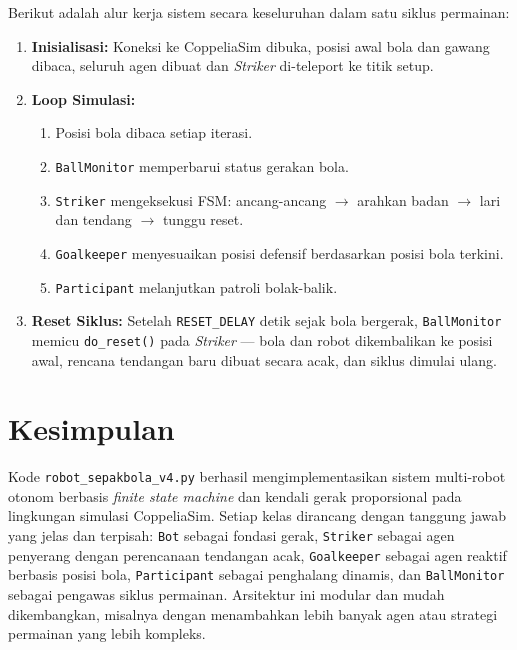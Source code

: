 \documentclass{article}
\begin{document}
Berikut adalah alur kerja sistem secara keseluruhan dalam satu siklus permainan:

\begin{enumerate}
    \item \textbf{Inisialisasi:} Koneksi ke CoppeliaSim dibuka, posisi awal
          bola dan gawang dibaca, seluruh agen dibuat dan \textit{Striker}
          di-teleport ke titik setup.
    \item \textbf{Loop Simulasi:}
    \begin{enumerate}
        \item Posisi bola dibaca setiap iterasi.
        \item \texttt{BallMonitor} memperbarui status gerakan bola.
        \item \texttt{Striker} mengeksekusi FSM: ancang-ancang $\to$ arahkan
              badan $\to$ lari dan tendang $\to$ tunggu reset.
        \item \texttt{Goalkeeper} menyesuaikan posisi defensif berdasarkan
              posisi bola terkini.
        \item \texttt{Participant} melanjutkan patroli bolak-balik.
    \end{enumerate}
    \item \textbf{Reset Siklus:} Setelah \texttt{RESET\_DELAY} detik sejak
          bola bergerak, \texttt{BallMonitor} memicu \texttt{do\_reset()} pada
          \textit{Striker} — bola dan robot dikembalikan ke posisi awal, rencana
          tendangan baru dibuat secara acak, dan siklus dimulai ulang.
\end{enumerate}

\section{Kesimpulan}

Kode \texttt{robot\_sepakbola\_v4.py} berhasil mengimplementasikan sistem
multi-robot otonom berbasis \textit{finite state machine} dan kendali gerak
proporsional pada lingkungan simulasi CoppeliaSim. Setiap kelas dirancang
dengan tanggung jawab yang jelas dan terpisah: \texttt{Bot} sebagai fondasi
gerak, \texttt{Striker} sebagai agen penyerang dengan perencanaan tendangan acak,
\texttt{Goalkeeper} sebagai agen reaktif berbasis posisi bola, \texttt{Participant}
sebagai penghalang dinamis, dan \texttt{BallMonitor} sebagai pengawas siklus
permainan. Arsitektur ini modular dan mudah dikembangkan, misalnya dengan
menambahkan lebih banyak agen atau strategi permainan yang lebih kompleks.
\end{document}
